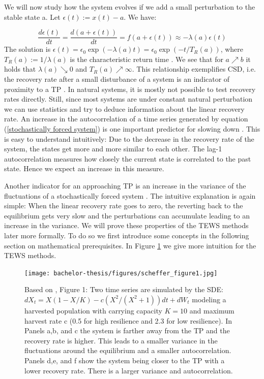 \documentclass[%
thesis=student,%
coverpage=false,%
titlepage=false,%
headmarks=true, %
english,%
font=libertine, %
math=newpxtx, %
BCOR=5mm,%
coverBCOR=11mm%
]{tumbook}
\begin{document}
We will now study how the system evolves if we add a small perturbation to the stable state a. Let $\epsilon(t):= x(t) - a$. We have:

\[
\frac{d\epsilon(t)}{dt} = \frac{d(a + \epsilon(t))}{dt} = f(a + \epsilon(t)) \approx 
 -\lambda(a)\epsilon(t)
\]
The solution is $\epsilon(t) = \epsilon_{0}\exp(-\lambda(a)t) = \epsilon_{0}\exp(-t/T_{R}(a))$, where $T_{R}(a) := 1/ \lambda(a)$ is the characteristic return time \cite{Wissel:1984}.
We see that for $a \nearrow b$ it holds that $\lambda(a) \searrow 0$ and $T_{R}(a)\nearrow \infty$. 
This relationship exemplifies CSD, i.e. the recovery rate after a small disturbance of a system is an indicator of proximity to a TP \cite{VanNes:2007}. In natural systems, it is mostly not possible to test recovery rates directly. Still, since most systems are under constant natural perturbation we can use statistics and try to deduce information about the linear recovery rate. An increase in the autocorrelation of a time series generated by equation (\ref{stochastically forced system}) is one important predictor for slowing down \cite{Ives:1995}. This is easy to understand intuitively: Due to the decrease in the recovery rate of the system, the states get more and more similar to each other. The lag-1 autocorrelation measures how closely the current state is correlated to the past state. Hence we expect an increase in this measure.

Another indicator for an approaching TP is an increase in the variance of the fluctuations of a stochastically forced system \cite{Carpenter:2006}. The intuitive explanation is again simple: When the linear recovery rate goes to zero, the reverting back to the equilibrium gets very slow and the perturbations can accumulate leading to an increase in the variance. 
We will prove these properties of the TEWS methods later more formally. To do so we first introduce some concepts in the following section on mathematical prerequisites. In Figure \ref{fig:scheffer_fig_1_reimp} we give more intuition for the TEWS methods. \\



\begin{figure}[h]
    \centering
    \texttt{[image: bachelor-thesis/figures/scheffer\_figure1.jpg]}
    \caption{Based on \cite{Scheffer:2009}, Figure 1:
    Two time series are simulated by the SDE: $dX_{t}=X(1-X/K)-c(X^2/(X^2+1))dt + dW_{t}$ modeling a harvested population with carrying capacity $K = 10$ and maximum harvest rate c (0.5 for high resilience and 2.3 for low resilience). In Panels a,b, and c the system is farther away from the TP and the recovery rate is higher. This leads to a smaller variance in the fluctuations around the equilibrium and a smaller autocorrelation. Panels d,e, and f show the system being closer to the TP with a lower recovery rate. There is a larger variance and autocorrelation.}
    \label{fig:scheffer_fig_1_reimp}
\end{figure}
\end{document}
